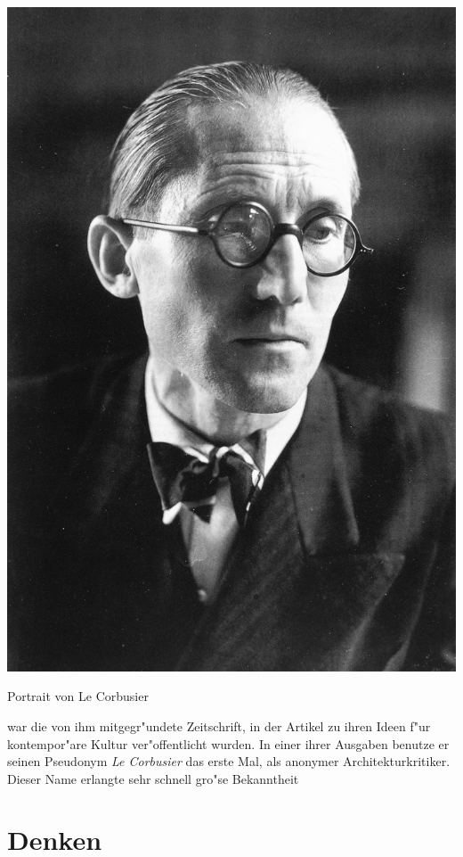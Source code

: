 \documentclass[a4paper]{tufte-handout}
\begin{document}
\begin{marginfigure}%
  \includegraphics[width=\linewidth]{portrait}
  \caption{Portrait von Le Corbusier}
  \label{fig:portrait}
\end{marginfigure}

 war die von ihm mitgegr"undete Zeitschrift, in der Artikel zu ihren Ideen f"ur kontempor"are Kultur ver"offentlicht wurden. In einer ihrer Ausgaben benutze er seinen Pseudonym \emph{Le Corbusier} das erste Mal, als anonymer Architekturkritiker. Dieser Name erlangte sehr schnell gro"se Bekanntheit


\section{Denken}\label{sec:page-layout}
\end{document}
